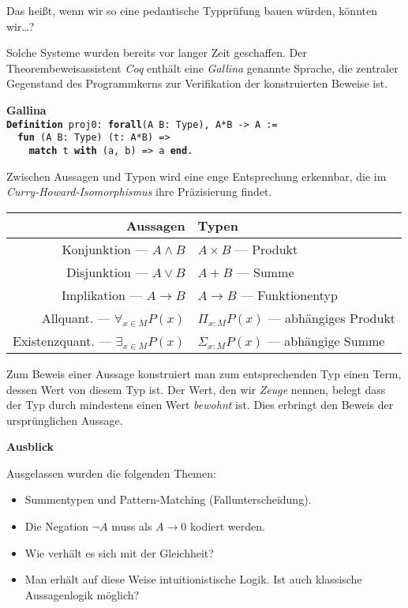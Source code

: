 \documentclass[9pt]{beamer}
\newcommand{\strong}[1]{\textsf{\textbf{#1}}}
\newcommand{\kw}[1]{\textbf{#1}}
\begin{document}
\begin{frame}
Das heißt, wenn wir so eine pedantische Typprüfung bauen würden,
könnten wir\ldots?\pause

\vspace{1em}
Solche Systeme wurden bereits vor langer Zeit geschaffen. Der
Theorembeweisassistent \emph{Coq} enthält eine \emph{Gallina} genannte
Sprache, die zentraler Gegenstand des Programmkerns zur Verifikation
der konstruierten Beweise ist.\pause

\vspace{1em}
\strong{Gallina}\\[4pt]
\texttt{\kw{Definition} proj0: \kw{forall}(A B: Type), A*B -> A :=\\
\ \ \kw{fun} (A B: Type) (t: A*B) =>\\
\ \ \ \ \kw{match} t \kw{with} (a, b) => a \kw{end}.}
\end{frame}

\begin{frame}
Zwischen Aussagen und Typen wird eine enge Entsprechung erkennbar,
die im \emph{Curry-Howard-Isomorphismus} ihre Präzisierung findet.\pause
\begin{table}
\begin{tabular}{rl}
\toprule
\strong{Aussagen} & \strong{Typen}\\
\midrule
Konjunktion --- $A\land B$ & $A\times B$ --- Produkt\\
Disjunktion --- $A\lor B$ & $A+B$ --- Summe\\
Implikation --- $A\to B$ & $A\to B$ --- Funktionentyp\\
Allquant. --- $\forall_{x\in M} P(x)$ & $\Pi_{x\colon M} P(x)$ --- abhängiges Produkt\\
Existenzquant. --- $\exists_{x\in M} P(x)$ & $\Sigma_{x\colon M}P(x)$ --- abhängige Summe\\
\bottomrule
\end{tabular}
\end{table}\pause

Zum Beweis einer Aussage konstruiert man zum entsprechenden Typ
einen Term, dessen Wert von diesem Typ ist. Der Wert, den wir
\emph{Zeuge} nennen, belegt dass der Typ durch mindestens
einen Wert \emph{bewohnt} ist. Dies erbringt den Beweis der
ursprünglichen Aussage.
\end{frame}

\begin{frame}
\strong{Ausblick}

\vspace{1em}
Ausgelassen wurden die folgenden Themen:
\begin{itemize}
\item Summentypen und Pattern-Matching (Fallunterscheidung).
\item Die Negation $\neg A$ muss als $A\to 0$ kodiert werden.
\item Wie verhält es sich mit der Gleichheit?
\item Man erhält auf diese Weise intuitionistische Logik.
  Ist auch klassische Aussagenlogik möglich?
\end{itemize}
\end{frame}
\end{document}
